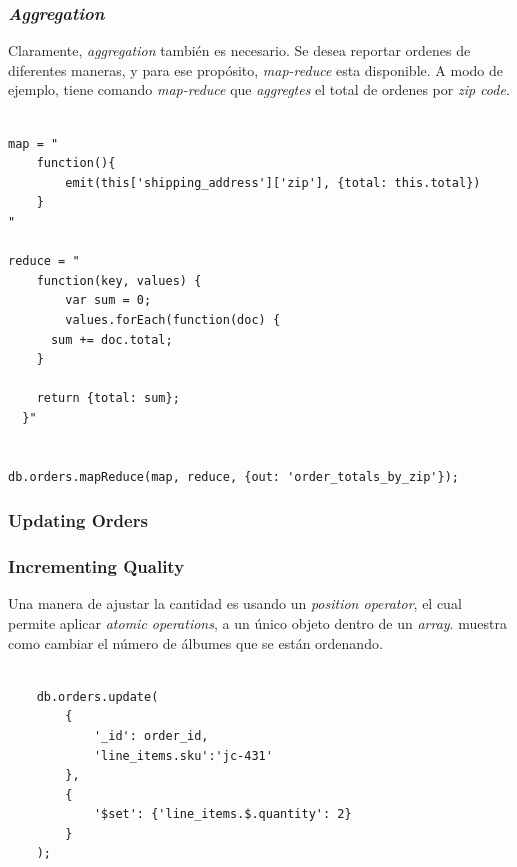 \subsubsection{\textit{Aggregation}}

Claramente, \textit{aggregation} también es necesario. Se desea reportar ordenes de diferentes maneras, y para ese propósito, \textit{map-reduce} esta disponible. A modo de ejemplo,   tiene comando \textit{map-reduce} que \textit{aggregtes} el total de ordenes por \textit{zip code}.

\begin{lstlisting}[caption= Ejemplo de commando \textit{map-reduce}., label=source:javascript:example_aggregation_mongodb]

map = "
	function(){
		emit(this['shipping_address']['zip'], {total: this.total})
	}
"

reduce = "
	function(key, values) {
		var sum = 0;
		values.forEach(function(doc) {
      sum += doc.total;
    }

    return {total: sum};
  }"


db.orders.mapReduce(map, reduce, {out: 'order_totals_by_zip'});

\end{lstlisting}

\subsubsection{Updating Orders}

\subsubsection*{Incrementing Quality}

Una manera de ajustar la cantidad es usando un \textit{position operator}, el cual permite aplicar \textit{atomic operations}, a un único objeto dentro de un \textit{array}.  muestra como cambiar el número de álbumes que se están ordenando.

\begin{lstlisting}[caption= Ejemplo de uso de \textit{position operator}., label=source:javascript:example_incrementing_quality_mongodb]

	db.orders.update(
		{
			'_id': order_id,
			'line_items.sku':'jc-431'
		},
		{
			'$set': {'line_items.$.quantity': 2}
		}
	);
		
\end{lstlisting}


